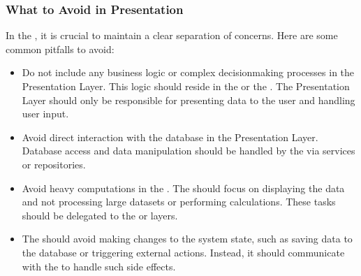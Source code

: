\documentclass[letterpaper,10pt,english]{sphinxhowto}
\begin{document}
\subsubsection{What to Avoid in Presentation}
\label{\detokenize{architecture/presentation/index:what-to-avoid-in-presentation}}
\sphinxAtStartPar
In the , it is crucial to maintain a clear separation of concerns. Here are some common pitfalls to avoid:
\begin{itemize}
\item {} \begin{description}
\sphinxAtStartPar
Do not include any business logic or complex decision\sphinxhyphen{}making processes in the Presentation Layer. This logic should reside in the  or the . The Presentation Layer should only be responsible for presenting data to the user and handling user input.

\end{description}

\item {} \begin{description}
\sphinxAtStartPar
Avoid direct interaction with the database in the Presentation Layer. Database access and data manipulation should be handled by the  via services or repositories.

\end{description}

\item {} \begin{description}
\sphinxAtStartPar
Avoid heavy computations in the . The  should focus on displaying the data and not processing large datasets or performing calculations. These tasks should be delegated to the  or  layers.

\end{description}

\item {} \begin{description}
\sphinxAtStartPar
The  should avoid making changes to the system state, such as saving data to the database or triggering external actions. Instead, it should communicate with the  to handle such side effects.


\end{description}
\end{itemize}
\end{document}
